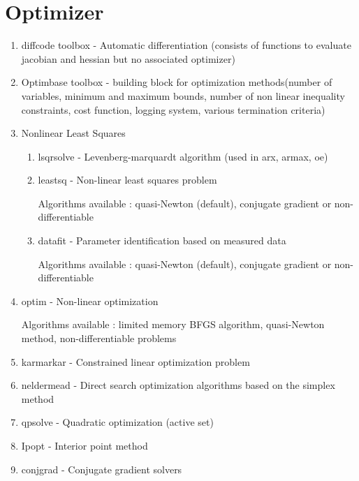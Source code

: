 \documentclass[a4paper,12pt]{report}
\begin{document}
	\chapter{Optimizer}
	\begin{enumerate}
		
		\item diffcode toolbox - Automatic differentiation (consists of functions to evaluate jacobian and hessian but no associated optimizer)
		\item Optimbase toolbox - building block for optimization methods(number of variables, minimum and maximum bounds, number of non linear inequality constraints, cost function, logging system, various termination criteria)
		
		\item Nonlinear Least Squares
		\begin{enumerate}
	     	\item lsqrsolve - Levenberg-marquardt algorithm (used in arx, armax, oe) 
		
		\item leastsq - Non-linear least squares problem 
		
		Algorithms available : quasi-Newton (default), conjugate gradient or non-differentiable
	
		
		
		
		\item datafit - Parameter identification based on measured data
		
	Algorithms available : quasi-Newton (default), conjugate gradient or non-differentiable
		
		
	\end{enumerate}
	\item optim - Non-linear optimization
		
		Algorithms available : limited memory BFGS algorithm, quasi-Newton method, non-differentiable problems
		
		
		\item karmarkar - Constrained linear optimization problem
		
		
		\item neldermead - Direct search optimization algorithms based on the simplex method
		
	\item qpsolve - Quadratic optimization (active set)
		
	\item Ipopt - Interior point method
		
		\item conjgrad - Conjugate gradient solvers
	\end{enumerate}
	
	
	
	
	
	
\end{document}
